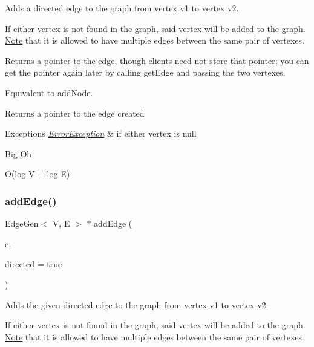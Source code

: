 Adds a directed edge to the graph from vertex v1 to vertex v2. 

If either vertex is not found in the graph, said vertex will be added to the graph. \mbox{\hyperlink{classNote}{Note}} that it is allowed to have multiple edges between the same pair of vertexes.

Returns a pointer to the edge, though clients need not store that pointer; you can get the pointer again later by calling get\+Edge and passing the two vertexes.

Equivalent to add\+Node.

\begin{DoxyReturn}{Returns}
a pointer to the edge created 
\end{DoxyReturn}

\begin{DoxyExceptions}{Exceptions}
{\em \mbox{\hyperlink{classErrorException}{Error\+Exception}}} & if either vertex is null \\
\hline
\end{DoxyExceptions}
\begin{DoxyRefDesc}{Big-\/\+Oh}
\item[\mbox{\hyperlink{BigOh__BigOh000004}{Big-\/\+Oh}}]O(log V + log E) \end{DoxyRefDesc}
\mbox{\label{classBasicGraphGen_a92cffe0dd5b70ab78a3bce486fd60637}} 
\subsubsection{\texorpdfstring{add\+Edge()}{addEdge()}\hspace{0.1cm}{\footnotesize\ttfamily [3/3]}}
{\footnotesize\ttfamily Edge\+Gen$<$ V, E $>$ $\ast$ add\+Edge (\begin{DoxyParamCaption}\item[{Edge\+Gen$<$ V, E $>$ $\ast$}]{e,  }\item[{bool}]{directed = {\ttfamily true} }\end{DoxyParamCaption})}



Adds the given directed edge to the graph from vertex v1 to vertex v2. 

If either vertex is not found in the graph, said vertex will be added to the graph. \mbox{\hyperlink{classNote}{Note}} that it is allowed to have multiple edges between the same pair of vertexes.

